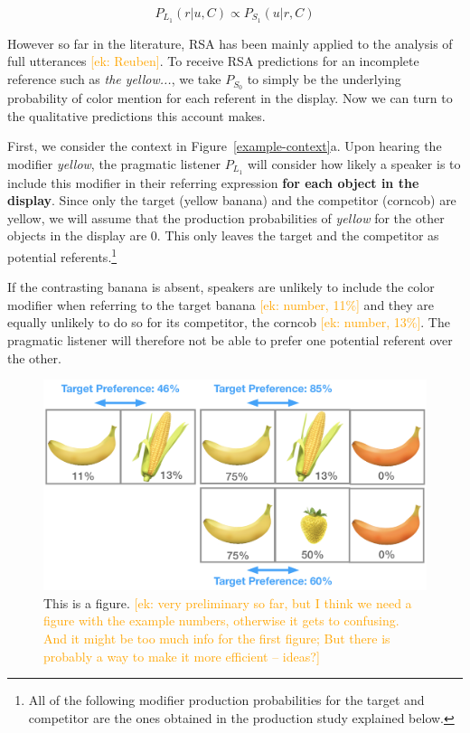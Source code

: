 \documentclass[10pt,letterpaper]{article}
\newcommand{\ek}[1]{\textcolor{Orange}{[ek: #1]}}
\begin{document}
\begin{equation}
	P_{L_1}(r|u,C) \propto P_{S_1}(u|r,C)
\label{eq-prior}
\end{equation}

However so far in the literature, RSA has been mainly applied to the analysis of full utterances \ek{Reuben}. To receive RSA predictions for an incomplete reference such as \textit{the yellow...}, we take $P_{S_0}$ to simply be the underlying probability of color mention for each referent in the display. Now we can turn to the qualitative predictions this account makes.

First, we consider the context in Figure~\ref{example-context}a. Upon hearing the modifier \textit{yellow}, the pragmatic listener $P_{L_1}$ will consider how likely a speaker is to include this modifier in their referring expression \textbf{for each object in the display}. Since only the target (yellow banana) and the competitor (corncob) are yellow, we will assume that the production probabilities of \textit{yellow} for the other objects in the display are 0. This only leaves the target and the competitor as potential referents.\footnote{All of the following modifier production probabilities for the target and competitor are the ones obtained in the production study explained below.}

If the contrasting banana is absent, speakers are unlikely to include the color modifier when referring to the target banana \ek{number, 11\%} and they are equally unlikely to do so for its competitor, the corncob \ek{number, 13\%}. The pragmatic listener will therefore not be able to prefer one potential referent over the other.

\begin{figure}
	\begin{center}
		\includegraphics[width=.475\textwidth]{graphs/target-pref.pdf}
	\end{center}
\caption{This is a figure. \ek{very preliminary so far, but I think we need a figure with the example numbers, otherwise it gets to confusing. And it might be too much info for the first figure; But there is probably a way to make it more efficient -- ideas?}} 
\label{target-pref}
\end{figure}
\end{document}
